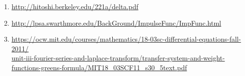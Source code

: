 \begin{enumerate}
	\item \label{itm:dirac_delta_def} \url{http://hitoshi.berkeley.edu/221a/delta.pdf}
	\item \label{itm:sifting_prop} \url{http://lpsa.swarthmore.edu/BackGround/ImpulseFunc/ImpFunc.html}
	\item \label{itm:convolution_thm} \url{https://ocw.mit.edu/courses/mathematics/18-03sc-differential-equations-fall-2011/} \\
	\url{unit-iii-fourier-series-and-laplace-transform/transfer-system-and-weight-functions-greens-formula/MIT18_03SCF11_s30_5text.pdf}
\end{enumerate}

